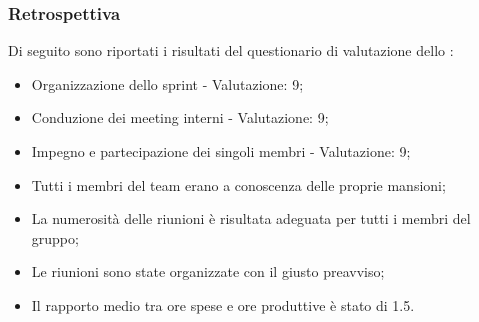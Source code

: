 \subsubsection{Retrospettiva}

\par Di seguito sono riportati i risultati del questionario di valutazione dello :
\begin{itemize}
  \item Organizzazione dello sprint - Valutazione: 9;
  \item Conduzione dei meeting interni - Valutazione: 9;
  \item Impegno e partecipazione dei singoli membri - Valutazione: 9;
  \item Tutti i membri del team erano a conoscenza delle proprie mansioni;
  \item La numerosità delle riunioni è risultata adeguata per tutti i membri del gruppo;
  \item Le riunioni sono state organizzate con il giusto preavviso;
  \item Il rapporto medio tra ore spese e ore produttive è stato di 1.5.
\end{itemize}

